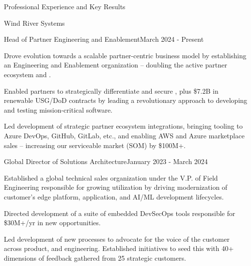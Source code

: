 \documentclass{resume} %
\begin{document}

\vspace{-2em}
\begin{rSection}{Professional Experience and Key Results}

  \begin{rCompany}{Wind River Systems}{}{}
    \begin{rRole}{Head of Partner Engineering and Enablement}{}{March 2024 - Present}
      \item Drove evolution towards a scalable partner-centric business model by establishing an Engineering and Enablement organization -- doubling the active partner ecosystem and .
      \item Enabled partners to strategically differentiate and secure , plus \$7.2B in renewable USG/DoD contracts by leading a revolutionary approach to developing and testing mission-critical software.
      \item Led development of strategic partner ecosystem integrations, bringing tooling to Azure DevOps, GitHub, GitLab, etc., and enabling AWS and Azure marketplace sales -- increasing our serviceable market (SOM) by \$100M+.
    \end{rRole}
    
    \begin{rRole}{Global Director of Solutions Architecture}{}{January 2023 - March 2024}
      \item Established a global technical sales organization under the V.P. of Field Engineering responsible for growing utilization by driving modernization of customer's edge platform, application, and AI/ML development lifecycles.
      \item Directed development of a suite of embedded DevSecOps tools responsible for \$30M+/yr in new opportunities.
      \item Led development of new processes to advocate for the voice of the customer across product, and engineering. Established initiatives to seed this with 40+ dimensions of feedback gathered from 25 strategic customers.
    \end{rRole}
  \end{rCompany}


\end{rSection}
\end{document}
